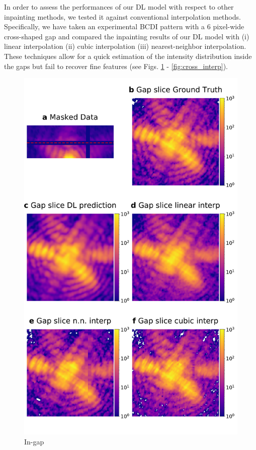 In order to assess the performances of our DL model with respect to other inpainting methods, we tested it against 
conventional interpolation methods. Specifically, we have taken an experimental BCDI pattern with a 6 pixel-wide 
cross-shaped gap and compared the inpainting results of our DL model with (i) linear interpolation (ii) cubic interpolation 
(iii) nearest-neighbor interpolation. These techniques allow for a quick estimation of the intensity distribution 
inside the gaps but fail to recover fine features (see Figs. \ref{fig:ingap_interp} - \ref{fig:cross_interp}). 
\begin{figure}[h]
    \centering
    \includegraphics[width=.6\textwidth]{figures/Inpainting/newfig3_suppl.pdf}
    \caption{In-gap}
    \label{fig:ingap_interp}
\end{figure}

